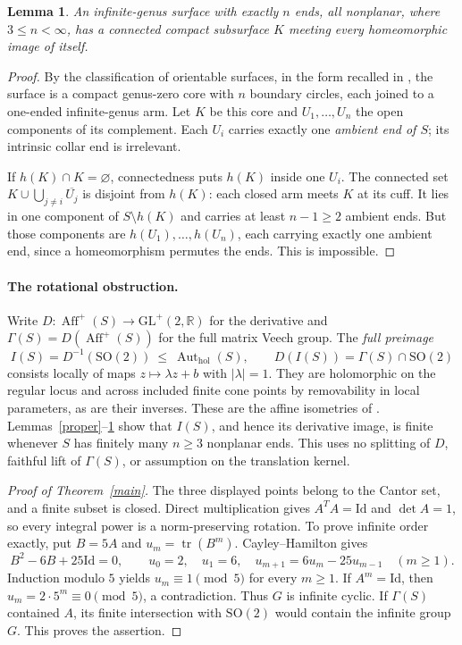 \documentclass[11pt]{article}
\newtheorem{lemma}[theorem]{Lemma}
\newcommand{\SO}{\mathrm{SO}(2)}
\newcommand{\GL}{\mathrm{GL}^{+}(2,\mathbb R)}
\newcommand{\Aut}{\operatorname{Aut}_{\mathrm{hol}}}
\begin{document}
\begin{lemma}\label{core}
An infinite-genus surface with exactly $n$ ends, all nonplanar, where $3\leq n<\infty$, has a connected compact subsurface $K$ meeting every homeomorphic image of itself.
\end{lemma}
\begin{proof}
By the classification of orientable surfaces, in the form recalled in \cite[Theorem~1.2]{RMV}, the surface is a compact genus-zero core with $n$ boundary circles, each joined to a one-ended infinite-genus arm. Let $K$ be this core and $U_1,\ldots,U_n$ the open components of its complement. Each $U_i$ carries exactly one \emph{ambient end of $S$}; its intrinsic collar end is irrelevant.

If $h(K)\cap K=\varnothing$, connectedness puts $h(K)$ inside one $U_i$. The connected set $K\cup\bigcup_{j\ne i}\overline{U_j}$ is disjoint from $h(K)$: each closed arm meets $K$ at its cuff. It lies in one component of $S\setminus h(K)$ and carries at least $n-1\geq2$ ambient ends. But those components are $h(U_1),\ldots,h(U_n)$, each carrying exactly one ambient end, since a homeomorphism permutes the ends. This is impossible.
\end{proof}

\paragraph{The rotational obstruction.}
Write $D:\operatorname{Aff}^{+}(S)\to\GL$ for the derivative and $\Gamma(S)=D(\operatorname{Aff}^{+}(S))$ for the full matrix Veech group. The \emph{full preimage}
\[
 I(S)=D^{-1}(\SO)\ \leq\ \Aut(S),\qquad
 D(I(S))=\Gamma(S)\cap\SO
\]
consists locally of maps $z\mapsto\lambda z+b$ with $|\lambda|=1$. They are holomorphic on the regular locus and across included finite cone points by removability in local parameters, as are their inverses. These are the affine isometries of \cite[Section~3.1]{ARSVW}. Lemmas~\ref{proper}--\ref{core} show that $I(S)$, and hence its derivative image, is finite whenever $S$ has finitely many $n\geq3$ nonplanar ends. This uses no splitting of $D$, faithful lift of $\Gamma(S)$, or assumption on the translation kernel.

\begin{proof}[Proof of Theorem~\ref{main}]
The three displayed points belong to the Cantor set, and a finite subset is closed. Direct multiplication gives $A^TA=\mathrm{Id}$ and $\det A=1$, so every integral power is a norm-preserving rotation. To prove infinite order exactly, put $B=5A$ and $u_m=\operatorname{tr}(B^m)$. Cayley--Hamilton gives
\[
 B^2-6B+25\mathrm{Id}=0,\qquad
 u_0=2,\quad u_1=6,\quad u_{m+1}=6u_m-25u_{m-1}\quad(m\geq1).
\]
Induction modulo $5$ yields $u_m\equiv1\pmod5$ for every $m\geq1$. If $A^m=\mathrm{Id}$, then $u_m=2\cdot5^m\equiv0\pmod5$, a contradiction. Thus $G$ is infinite cyclic. If $\Gamma(S)$ contained $A$, its finite intersection with $\SO$ would contain the infinite group $G$. This proves the assertion.
\end{proof}
\end{document}
